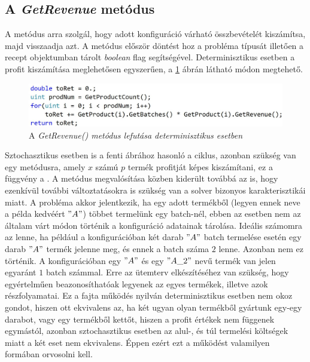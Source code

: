 \subsection{A \textit{GetRevenue} metódus} \label{getRevenue}
A  metódus arra szolgál, hogy adott konfiguráció várható összbevételét kiszámítsa, majd visszaadja azt.
A metódus először döntést hoz a probléma típusát illetően a recept objektumban tárolt \textit{boolean} flag segítségével.
Determinisztikus esetben a profit kiszámítása meglehetősen egyszerűen, a \ref{getRevenueNonStoch} ábrán látható módon megtehető. 
\begin{figure}[H]
\begin{center}
\includegraphics[scale=0.38]{getRevenueNonStoch}
\caption{A \textit{GetRevenue() metódus lefutása determinisztikus esetben}}
\label{getRevenueNonStoch}
\end{center}
\end{figure}
Sztochasztikus esetben is a fenti ábrához hasonló a ciklus, azonban szükség van egy metódusra, amely $x$ számú $p$ termék profitját képes kiszámítani, ez a függvény a .
A metódus megvalósítása közben kiderült továbbá az is, hogy ezenkívül további változtatásokra is szükség van a solver bizonyos karakterisztikái miatt.
A probléma akkor jelentkezik, ha egy adott termékből (legyen ennek neve a példa kedvéért $"A"$) többet termelünk egy batch-nél, ebben az esetben nem az általam várt módon történik a konfiguráció adatainak tárolása.
Ideális számomra az lenne, ha például a konfigurációban két darab $"A"$ batch termelése esetén egy darab $"A"$ termék jelenne meg, és ennek a batch száma $2$ lenne.
Azonban nem ez történik.
A konfigurációban egy $"A"$ és egy $"A\_2"$ nevű termék van jelen egyaránt $1$ batch számmal.
Erre az ütemterv elkészítéséhez van szükség, hogy egyértelműen beazonosíthatóak legyenek az egyes termékek, illetve azok részfolyamatai.
Ez a fajta működés nyilván determinisztikus esetben nem okoz gondot, hiszen ott ekvivalens az, ha két ugyan olyan termékből gyártunk egy-egy darabot, vagy egy termékből kettőt, hiszen a profit értékek nem függenek egymástól, azonban sztochasztikus esetben az alul-, és túl termelési költségek miatt a két eset nem ekvivalens.
Éppen ezért ezt a működést valamilyen formában orvosolni kell.
